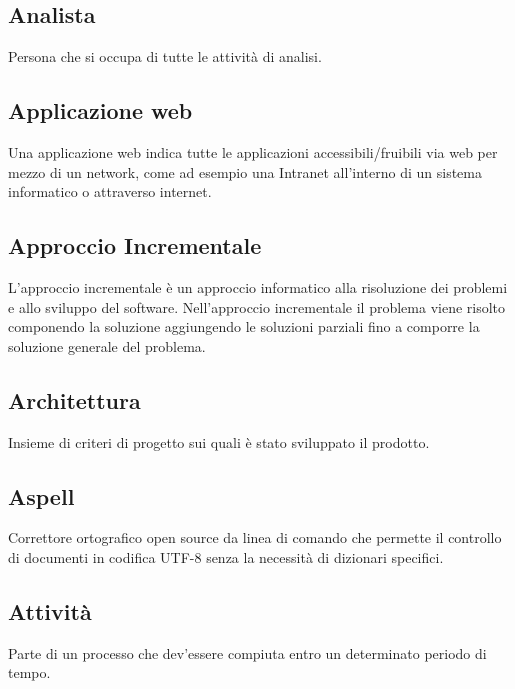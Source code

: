 \documentclass[../glossario.tex]{subfiles}
\begin{document}
\subsection*{Analista}
Persona che si occupa di tutte le attività di analisi.

\subsection*{Applicazione web}
Una applicazione web indica tutte le applicazioni accessibili/fruibili via web per mezzo di un network, come ad esempio una Intranet all'interno di un sistema informatico o attraverso internet. 

\subsection*{Approccio Incrementale}
L'approccio incrementale è un approccio informatico alla risoluzione dei problemi e allo sviluppo del software. Nell'approccio incrementale il problema viene risolto componendo la soluzione aggiungendo le soluzioni parziali fino a comporre la soluzione generale del problema.

\subsection*{Architettura}
Insieme di criteri di progetto sui quali è stato sviluppato il prodotto.

\subsection*{Aspell}
Correttore ortografico open source da linea di comando che permette il controllo di documenti in codifica UTF-8 senza la necessità di dizionari specifici.

\subsection*{Attività}
Parte di un processo che dev'essere compiuta entro un determinato periodo di tempo.
\end{document}
